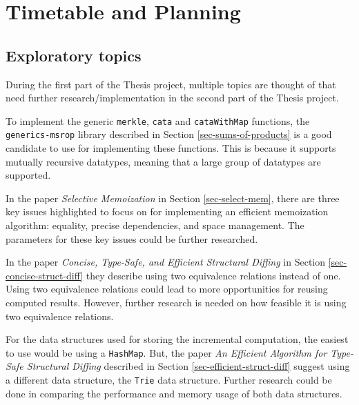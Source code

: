 \section{Timetable and Planning}
\subsection{Exploratory topics}
During the first part of the Thesis project, multiple topics are thought of that need further research/implementation in the second part of the Thesis project.

To implement the generic \texttt{merkle}, \texttt{cata} and \texttt{cataWithMap} functions, the \texttt{generics-msrop} library described in Section \ref{sec-sums-of-products} is a good candidate to use for implementing these functions. This is because it supports mutually recursive datatypes, meaning that a large group of datatypes are supported. 

In the paper \textit{Selective Memoization} in Section \ref{sec-select-mem}, there are three key issues highlighted to focus on for implementing an efficient memoization algorithm: equality, precise dependencies, and space management. The parameters for these key issues could be further researched.

In the paper \textit{Concise, Type-Safe, and Efficient Structural Diffing} in Section \ref{sec-concise-struct-diff} they describe using two equivalence relations instead of one. Using two equivalence relations could lead to more opportunities for reusing computed results. However, further research is needed on how feasible it is using two equivalence relations. 

For the data structures used for storing the incremental computation, the easiest to use would be using a \texttt{HashMap}. But, the paper \textit{An Efficient Algorithm for Type-Safe Structural Diffing} described in Section \ref{sec-efficient-struct-diff} suggest using a different data structure, the \texttt{Trie} data structure. Further research could be done in comparing the performance and memory usage of both data structures.


